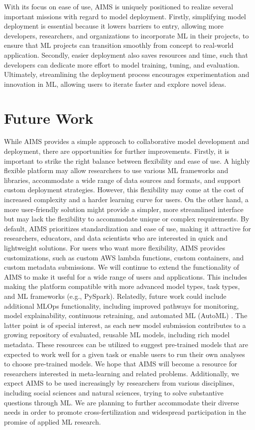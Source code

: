 With its focus on ease of use, AIMS is uniquely positioned to realize several important missions with regard to model deployment. Firstly, simplifying model deployment is essential because it lowers barriers to entry, allowing more developers, researchers, and organizations to incorporate ML in their projects, to ensure that ML projects can transition smoothly from concept to real-world application. Secondly, easier deployment also saves resources and time, such that developers can dedicate more effort to model training, tuning, and evaluation. Ultimately, streamlining the deployment process encourages experimentation and innovation in ML, allowing users to iterate faster and explore novel ideas.


\section{Future Work}
While AIMS provides a simple approach to collaborative model development and deployment, there are opportunities for further improvements. Firstly, it is important to strike the right balance between flexibility and ease of use. A highly flexible platform may allow researchers to use various ML frameworks and libraries, accommodate a wide range of data sources and formats, and support custom deployment strategies. However, this flexibility may come at the cost of increased complexity and a harder learning curve for users. On the other hand, a more user-friendly solution might provide a simpler, more streamlined interface but may lack the flexibility to accommodate unique or complex requirements. By default, AIMS prioritizes standardization and ease of use, making it attractive for researchers, educators, and data scientists who are interested in quick and lightweight solutions. For users who want more flexibility, AIMS provides customizations, such as custom AWS lambda functions, custom containers, and custom metadata submissions. We will continue to extend the functionality of AIMS to make it useful for a wide range of users and applications. This includes making the platform compatible with more advanced model types, task types, and ML frameworks (e.g., PySpark). Relatedly, future work could include additional MLOps functionality, including improved pathways for monitoring, model explainability, continuous retraining, and automated ML (AutoML) \citep{hutter_automated_2019, he_automl_2021}. The latter point is of special interest, as each new model submission contributes to a growing repository of evaluated, reusable ML models, including rich model metadata. These resources can be utilized to suggest pre-trained models that are expected to work well for a given task or enable users to run their own analyses to choose pre-trained models. We hope that AIMS will become a resource for researchers interested in meta-learning \citep{hospedales_meta-learning_2020, finn_model-agnostic_2017} and related problems. Additionally, we expect AIMS to be used increasingly by researchers from various disciplines, including social sciences and natural sciences, trying to solve substantive questions through ML. We are planning to further accommodate their diverse needs in order to promote cross-fertilization and widespread participation in the promise of applied ML research. 


